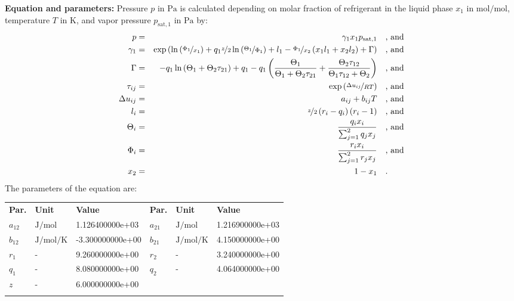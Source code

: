 \textbf{Equation and parameters:}
\newline
%
Pressure $p$ in $\si{\pascal}$ is calculated depending on molar fraction of refrigerant in the liquid phase $x_1$ in $\si{\mole\per\mole}$, temperature $T$ in $\si{\kelvin}$, and vapor pressure $p_\mathrm{sat,1}$ in $\si{\pascal}$ by:
%
\begin{equation*}
\begin{split}
p &=& \gamma_1 x_1 p_\mathrm{sat,1} & \quad\text{, and} \\
\gamma_1 &=& \exp \left( \ln \left( \nicefrac{\Phi_1}{x_1} \right) + q_1 \nicefrac{z}{2} \ln \left( \nicefrac{\Theta_1}{\Phi_1} \right) + l_1 - \nicefrac{\Phi_1}{x_2} \left( x_1 l_1 + x_2 l_2 \right) + \Gamma \right) & \quad\text{, and} \\
\Gamma &=& - q_1 \ln \left( \Theta_1 + \Theta_2 \tau_{21} \right) + q_1 - q_1 \left( \frac{\Theta_1}{\Theta_1 + \Theta_2 \tau_{21}} + \frac{\Theta_2 \tau_{12}}{\Theta_1 \tau_{12} + \Theta_2} \right) & \quad\text{, and} \\
\tau_{ij} &=& \exp \left( \nicefrac{\Delta u_{ij}}{R T} \right) & \quad\text{, and} \\
\Delta u_{ij} &=& a_{ij} + b_{ij} T & \quad\text{, and} \\
l_i &=& \nicefrac{z}{2} \left( r_i - q_i \right) \left(r_i - 1 \right) & \quad\text{, and} \\
\Theta_i &=& \frac{q_i x_i}{\sum_{j=1}^{2} q_j x_j} & \quad\text{, and} \\
\Phi_i &=& \frac{r_i x_i}{\sum_{j=1}^{2} r_j x_j} & \quad\text{, and} \\
x_2 &=& 1 - x_1  & \quad\text{.} \\
\end{split}
\end{equation*}
%
The parameters of the equation are:
%
\begin{longtable}[l]{lll|lll}
\toprule
\addlinespace
\textbf{Par.} & \textbf{Unit} & \textbf{Value} &	\textbf{Par.} & \textbf{Unit} & \textbf{Value} \\
\addlinespace
\midrule
\endhead

\bottomrule
\endfoot
\bottomrule
\endlastfoot
\addlinespace

$a_{12}$ & $\si{\joule\per\mole}$ & 1.126400000e+03 & $a_{21}$ & $\si{\joule\per\mole}$ & 1.216900000e+03 \\
$b_{12}$ & $\si{\joule\per\mole\per\kelvin}$ & -3.300000000e+00 & $b_{21}$ & $\si{\joule\per\mole\per\kelvin}$ & 4.150000000e+00 \\
$r_{1}$ & - & 9.260000000e+00 & $r_{2}$ & - & 3.240000000e+00 \\
$q_{1}$ & - & 8.080000000e+00 & $q_{2}$ & - & 4.064000000e+00 \\
$z$ & - & 6.000000000e+00 & & &  \\

\addlinespace\end{longtable}

